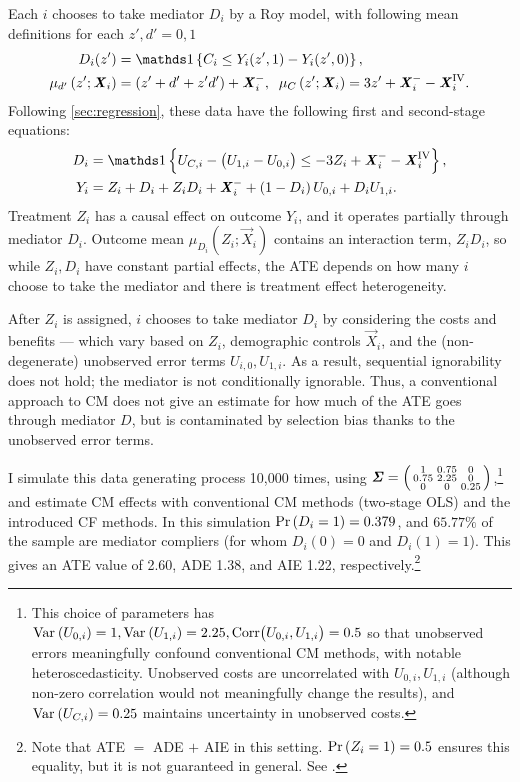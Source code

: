 Each $i$ chooses to take mediator $D_i$ by a Roy model, with following mean definitions for each $z', d' = 0, 1$
\begin{align*}
    D_i(z') &= \indicator{C_i \leq Y_i(z', 1) - Y_i(z', 0)},  \\
    \mu_{d'}\left(z' ; \vec X_i \right) &= \left( z' + d' + z' d' \right) + \vec X_i^-,
    \;\; \mu_{C}\left(z' ; \vec X_i \right) = 3z' + \vec X_i^- - \vec X_i^{\text{IV}}.
\end{align*}
Following \autoref{sec:regression}, these data have the following first and second-stage equations:
\begin{align*}
    D_i &= \indicator{U_{C,i} - \big( U_{1,i} - U_{0,i} \big)
    \leq -3Z_i + \vec X_i^- - \vec X_i^{\text{IV}}},  \\
    Y_i &= Z_i + D_i + Z_i D_i + \vec X_i^-
        + \left( 1 - D_i \right) U_{0,i} + D_i U_{1,i}.
\end{align*}
Treatment $Z_i$ has a causal effect on outcome $Y_i$, and it operates partially through mediator $D_i$.
Outcome mean $\mu_{D_i}\left( Z_i; \vec X_i \right)$ contains an interaction term, $Z_i D_i$, so while $Z_i,D_i$ have constant partial effects, the ATE depends on how many $i$ choose to take the mediator and there is treatment effect heterogeneity.

After $Z_i$ is assigned, $i$ chooses to take mediator $D_i$ by considering the costs and benefits --- which vary based on $Z_i$, demographic controls $\vec X_i$, and the (non-degenerate) unobserved error terms $U_{i,0}, U_{1,i}$.
As a result, sequential ignorability does not hold; the mediator is not conditionally ignorable.
Thus, a conventional approach to CM does not give an estimate for how much of the ATE goes through mediator $D$, but is contaminated by selection bias thanks to the unobserved error terms.

I simulate this data generating process 10,000 times, using $\boldsymbol{\mathit{\Sigma}} =
\left(\begin{smallmatrix} 1 & 0.75 & 0 \\ 0.75 & 2.25 & 0 \\ 0 & 0 & 0.25 \end{smallmatrix}\right)$,\footnote{
    This choice of parameters has $\text{Var}_{} \left( U_{0,i} \right) = 1, \text{Var}_{} \left( U_{1,i} \right) = 2.25, \text{Corr}\big(U_{0,i}, U_{1,i}\big) = 0.5$ so that unobserved errors meaningfully confound conventional CM methods, with notable heteroscedasticity.
    Unobserved costs are uncorrelated with $U_{0,i}, U_{1,i}$ (although non-zero correlation would not meaningfully change the results), and $\text{Var}_{} \left( U_{C,i} \right) = 0.25$ maintains uncertainty in unobserved costs.
}
and estimate CM effects with conventional CM methods (two-stage OLS) and the introduced CF methods.
In this simulation $\Pr\left( D_i = 1 \right) = 0.379$, and $65.77\%$ of the sample are mediator compliers (for whom $D_i(0)=0$ and $D_i(1)=1$).
This gives an ATE value of 2.60, ADE 1.38, and AIE 1.22, respectively.\footnote{
    Note that ATE $=$ ADE $+$ AIE in this setting.
    $\Pr\left( Z_i=1 \right) = 0.5$ ensures this equality, but it is not guaranteed in general.
    See .
}

